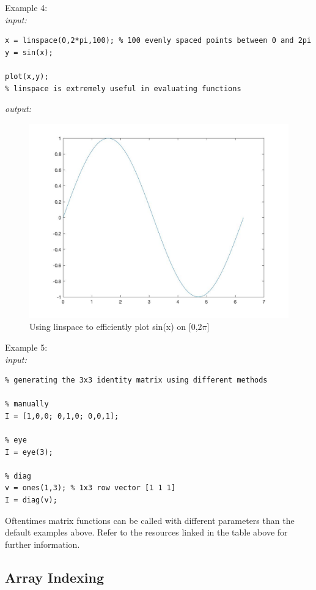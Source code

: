 \documentclass[../MATLAB_Primer.tex]{subfiles}
\begin{document}
Example 4:\\

\textit{input:}
\begin{lstlisting}
x = linspace(0,2*pi,100); % 100 evenly spaced points between 0 and 2pi
y = sin(x);

plot(x,y);
% linspace is extremely useful in evaluating functions 
\end{lstlisting}
\textit{output:}
\begin{figure}[H]
    \centering
    \includegraphics[width=350pt]{images/sample_plot.jpg}
    \caption{Using linspace to efficiently plot sin(x) on [0,2$\pi$]}
    \label{fig:sample_plot}
\end{figure}

Example 5:\\

\textit{input:}
\begin{lstlisting}
% generating the 3x3 identity matrix using different methods 

% manually 
I = [1,0,0; 0,1,0; 0,0,1];

% eye
I = eye(3);

% diag 
v = ones(1,3); % 1x3 row vector [1 1 1]
I = diag(v);

\end{lstlisting}

Oftentimes matrix functions can be called with different parameters than the default examples above.  Refer to the resources linked in the table above for further information.

\subsection{Array Indexing} \label{Indexing}
\end{document}
